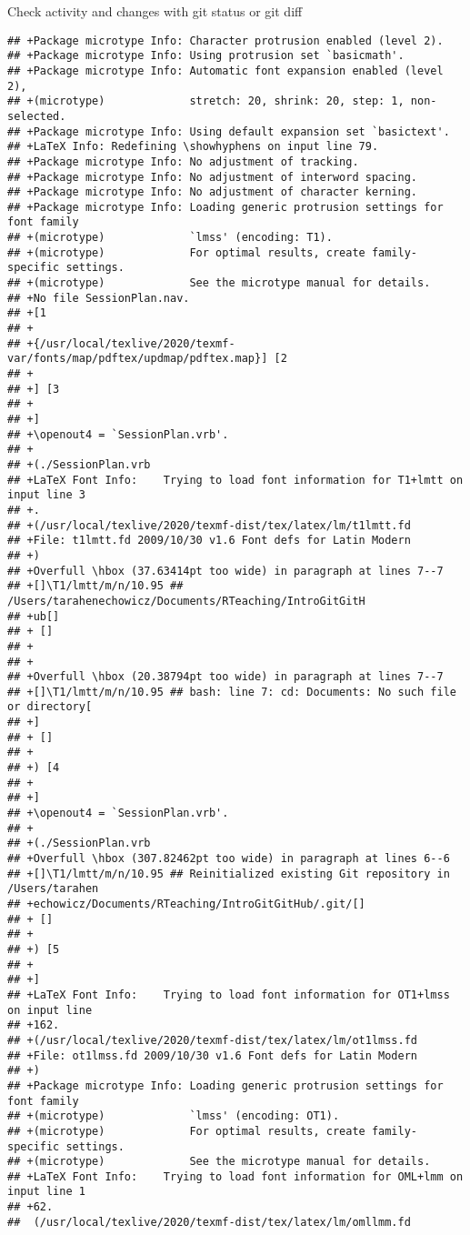 \documentclass[ignorenonframetext,]{beamer}
\begin{document}
\begin{frame}[fragile]{Check activity and changes with git status or git
diff}
\begin{verbatim}
## +Package microtype Info: Character protrusion enabled (level 2).
## +Package microtype Info: Using protrusion set `basicmath'.
## +Package microtype Info: Automatic font expansion enabled (level 2),
## +(microtype)             stretch: 20, shrink: 20, step: 1, non-selected.
## +Package microtype Info: Using default expansion set `basictext'.
## +LaTeX Info: Redefining \showhyphens on input line 79.
## +Package microtype Info: No adjustment of tracking.
## +Package microtype Info: No adjustment of interword spacing.
## +Package microtype Info: No adjustment of character kerning.
## +Package microtype Info: Loading generic protrusion settings for font family
## +(microtype)             `lmss' (encoding: T1).
## +(microtype)             For optimal results, create family-specific settings.
## +(microtype)             See the microtype manual for details.
## +No file SessionPlan.nav.
## +[1
## +
## +{/usr/local/texlive/2020/texmf-var/fonts/map/pdftex/updmap/pdftex.map}] [2
## +
## +] [3
## +
## +]
## +\openout4 = `SessionPlan.vrb'.
## +
## +(./SessionPlan.vrb
## +LaTeX Font Info:    Trying to load font information for T1+lmtt on input line 3
## +.
## +(/usr/local/texlive/2020/texmf-dist/tex/latex/lm/t1lmtt.fd
## +File: t1lmtt.fd 2009/10/30 v1.6 Font defs for Latin Modern
## +)
## +Overfull \hbox (37.63414pt too wide) in paragraph at lines 7--7
## +[]\T1/lmtt/m/n/10.95 ## /Users/tarahenechowicz/Documents/RTeaching/IntroGitGitH
## +ub[] 
## + []
## +
## +
## +Overfull \hbox (20.38794pt too wide) in paragraph at lines 7--7
## +[]\T1/lmtt/m/n/10.95 ## bash: line 7: cd: Documents: No such file or directory[
## +] 
## + []
## +
## +) [4
## +
## +]
## +\openout4 = `SessionPlan.vrb'.
## +
## +(./SessionPlan.vrb
## +Overfull \hbox (307.82462pt too wide) in paragraph at lines 6--6
## +[]\T1/lmtt/m/n/10.95 ## Reinitialized existing Git repository in /Users/tarahen
## +echowicz/Documents/RTeaching/IntroGitGitHub/.git/[] 
## + []
## +
## +) [5
## +
## +]
## +LaTeX Font Info:    Trying to load font information for OT1+lmss on input line 
## +162.
## +(/usr/local/texlive/2020/texmf-dist/tex/latex/lm/ot1lmss.fd
## +File: ot1lmss.fd 2009/10/30 v1.6 Font defs for Latin Modern
## +)
## +Package microtype Info: Loading generic protrusion settings for font family
## +(microtype)             `lmss' (encoding: OT1).
## +(microtype)             For optimal results, create family-specific settings.
## +(microtype)             See the microtype manual for details.
## +LaTeX Font Info:    Trying to load font information for OML+lmm on input line 1
## +62.
##  (/usr/local/texlive/2020/texmf-dist/tex/latex/lm/omllmm.fd

\end{verbatim}
\end{frame}
\end{document}
